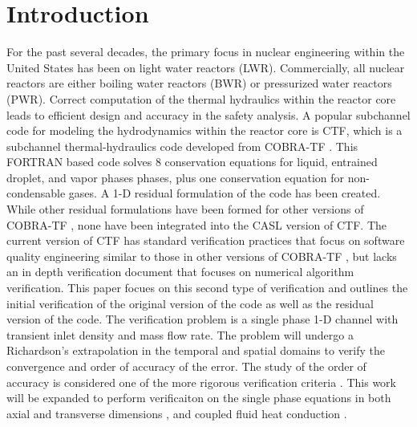 \vspace*{-80mm}
\chapter{Introduction} \label{chapter1:introduction}

For the past several decades, the primary focus in nuclear engineering within
the United States has been on light water reactors (LWR). Commercially,
all nuclear reactors are either boiling water reactors (BWR) or pressurized
water reactors (PWR). Correct computation of the thermal hydraulics within the
reactor core leads to efficient design and accuracy in the safety analysis. A
popular subchannel code for modeling the hydrodynamics within the reactor core
is CTF, which is a subchannel thermal-hydraulics code developed from
COBRA-TF \cite{Salko2014}. This FORTRAN based code solves 8 conservation
equations for liquid, entrained droplet, and vapor phases phases, plus one
conservation equation for non-condensable gases. A 1-D residual formulation of
the code has been created. While other residual formulations have been
formed for other versions of COBRA-TF \cite{Lloyd2014}, none have been
integrated into the CASL version of CTF. The current version of CTF has standard
verification practices that focus on software quality engineering similar to
those in other versions of COBRA-TF \cite{Aumiller2013}, but lacks an in
depth verification document that focuses on numerical algorithm verification.
This paper focues on this second type of verification and outlines the initial
verification of the original version of the code as well as the residual version
of the code. The verification problem is a single phase 1-D channel with
transient inlet density and mass flow rate. The problem will undergo a
Richardson's extrapolation in the temporal and spatial domains to verify the
convergence and order of accuracy of the error. The study of the order of
accuracy is considered one of the more rigorous verification criteria \cite{Roy2005}.
This work will be expanded to perform verificaiton on the single
phase equations in both axial and transverse dimensions \cite{Merroun2009}, and
coupled fluid heat conduction \cite{Mahadevan2009}.









